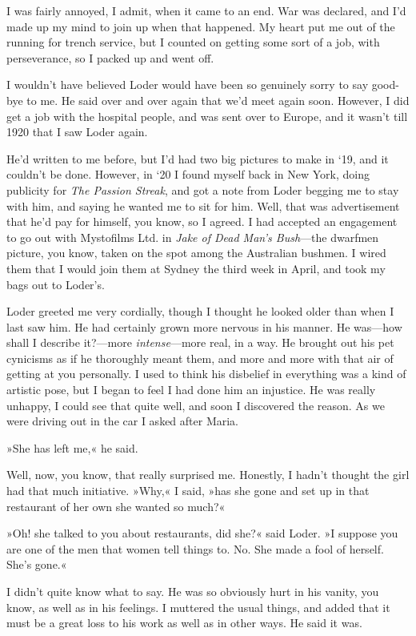 I was fairly annoyed, I admit, when it came to an end. War was declared, and I'd made up my mind to join up when that happened. My heart put me out of the running for trench service, but I counted on getting some sort of a job, with perseverance, so I packed up and went off.

I wouldn't have believed Loder would have been so genuinely sorry to say good-bye to me. He said over and over again that we'd meet again soon. However, I did get a job with the hospital people, and was sent over to Europe, and it wasn't till 1920 that I saw Loder again.

He'd written to me before, but I'd had two big pictures to make in `19, and it couldn't be done. However, in `20 I found myself back in New York, doing publicity for \textit{The Passion Streak}, and got a note from Loder begging me to stay with him, and saying he wanted me to sit for him. Well, that was advertisement that he'd pay for himself, you know, so I agreed. I had accepted an engagement to go out with Mystofilms Ltd. in \textit{Jake of Dead Man's Bush}—the dwarfmen picture, you know, taken on the spot among the Australian bushmen. I wired them that I would join them at Sydney the third week in April, and took my bags out to Loder's.

Loder greeted me very cordially, though I thought he looked older than when I last saw him. He had certainly grown more nervous in his manner. He was—how shall I describe it?—more \textit{intense}—more real, in a way. He brought out his pet cynicisms as if he thoroughly meant them, and more and more with that air of getting at you personally. I used to think his disbelief in everything was a kind of artistic pose, but I began to feel I had done him an injustice. He was really unhappy, I could see that quite well, and soon I discovered the reason. As we were driving out in the car I asked after Maria.

»She has left me,« he said.

Well, now, you know, that really surprised me. Honestly, I hadn't thought the girl had that much initiative. »Why,« I said, »has she gone and set up in that restaurant of her own she wanted so much?«

»Oh! she talked to you about restaurants, did she?« said Loder. »I suppose you are one of the men that women tell things to. No. She made a fool of herself. She's gone.«

I didn't quite know what to say. He was so obviously hurt in his vanity, you know, as well as in his feelings. I muttered the usual things, and added that it must be a great loss to his work as well as in other ways. He said it was.

